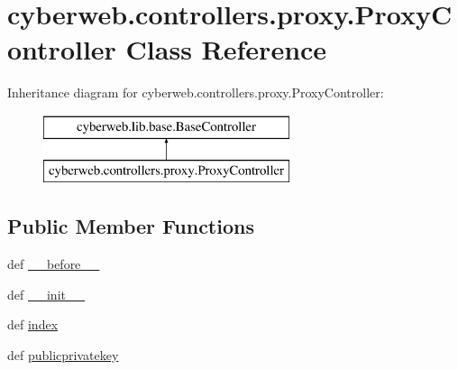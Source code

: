 \hypertarget{classcyberweb_1_1controllers_1_1proxy_1_1_proxy_controller}{\section{cyberweb.\-controllers.\-proxy.\-Proxy\-Controller \-Class \-Reference}
\label{classcyberweb_1_1controllers_1_1proxy_1_1_proxy_controller}
}
\-Inheritance diagram for cyberweb.\-controllers.\-proxy.\-Proxy\-Controller\-:\begin{figure}[H]
\begin{center}
\leavevmode
\includegraphics[height=2.000000cm]{classcyberweb_1_1controllers_1_1proxy_1_1_proxy_controller}
\end{center}
\end{figure}
\subsection*{\-Public \-Member \-Functions}
\begin{DoxyCompactItemize}
\item 
def \hyperlink{classcyberweb_1_1controllers_1_1proxy_1_1_proxy_controller_aa15d3a939bb82e31c869bab8347fd94e}{\-\_\-\-\_\-before\-\_\-\-\_\-}
\item 
def \hyperlink{classcyberweb_1_1controllers_1_1proxy_1_1_proxy_controller_a39bdef67f7bf91b72e0c453f15cbb131}{\-\_\-\-\_\-init\-\_\-\-\_\-}
\item 
def \hyperlink{classcyberweb_1_1controllers_1_1proxy_1_1_proxy_controller_aa0421eab85b57417e387fc1a2a235be0}{index}
\item 
def \hyperlink{classcyberweb_1_1controllers_1_1proxy_1_1_proxy_controller_aa8f93c3b870aa14a97fdae8d4ca29eb0}{publicprivatekey}
\end{DoxyCompactItemize}


